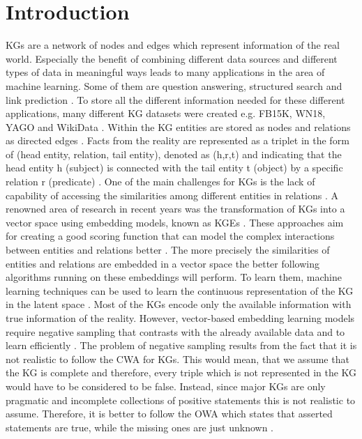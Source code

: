 \chapter{Introduction}
\label{ch:introduction}

\acp{KG} are a network of nodes and edges which represent information of the real world. 
Especially the benefit of combining different data sources and different types of data in meaningful ways leads to many applications in the area of machine learning.
Some of them are question answering, structured search \cite{zhang2019nscaching} and link prediction \cite{cai2017kbgan, Alam2020AffinityDN}.
To store all the different information needed for these different applications, many different \ac{KG} datasets were created e.g. FB15K, WN18, YAGO \cite{ConEx} and WikiData \cite{arnaoutwikinegata}.
Within the \ac{KG} entities are stored as nodes and relations as directed edges \cite{zhang2019nscaching}.
Facts from the reality are represented as a triplet in the form of (head entity, relation, tail entity), denoted as (h,r,t) and indicating that the head entity h (subject) is connected with the tail entity t (object) by a specific relation r (predicate) \cite{zhang2019nscaching, Alam2020AffinityDN}.
One of the main challenges for \acp{KG} is the lack of capability of accessing the similarities among different entities in relations \cite{cai2017kbgan}. 
A renowned area of research in recent years was the transformation of \acp{KG} into a vector space using embedding models, known as \acp{KGE} \cite{Alam2020AffinityDN}.
These approaches aim for creating a good scoring function that can model the complex interactions between entities and relations better \cite{zhang2019nscaching}.
The more precisely the similarities of entities and relations are embedded in a vector space the better following algorithms running on these embeddings will perform.
To learn them, machine learning techniques can be used to learn the continuous representation of the \ac{KG} in the latent space \cite{cai2017kbgan}. 
Most of the \acp{KG} encode only the available information with true information of the reality.
However, vector-based embedding learning models require negative sampling that contrasts with the already available data and to learn efficiently \cite{Alam2020AffinityDN}. 
The problem of negative sampling results from the fact that it is not realistic to follow the \ac{CWA} for \acp{KG}. 
This would mean, that we assume that the \ac{KG} is complete and therefore, every triple which is not represented in the \ac{KG} would have to be considered to be false. 
Instead, since major \acp{KG} are only pragmatic and incomplete collections of positive statements \cite{arnaout2020enriching} this is not realistic to assume. 
Therefore, it is better to follow the \ac{OWA} which states that asserted statements are true, while the missing ones are just unknown \cite{arnaout2020enriching}.


